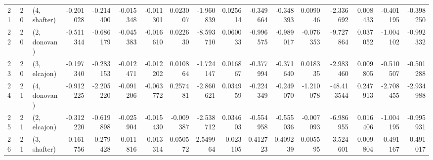\begin{tabular}{lllrrrrrrrrrrrrrr}
21 &    20 &  (4, shafter) & -0.201028 & -0.214400 &  -0.015348 & -0.011301 &  0.023007 &   -1.960839 &  0.025614 &  -0.349664 & -0.348393 &  0.009046 &  -2.336692 &  0.008433 & -0.401195 & -0.398250 \\
22 &    20 &  (2, donovan) & -0.511344 & -0.686179 &  -0.045383 & -0.016610 &  0.022630 &   -8.593710 &  0.060033 &  -0.996575 & -0.989017 & -0.076353 &  -9.727864 &  0.037052 & -1.004102 & -0.992332 \\
23 &    20 &  (3, elcajon) & -0.197340 & -0.283153 &  -0.012471 & -0.012202 &  0.010864 &   -1.724147 &  0.016867 &  -0.377994 & -0.371640 &  0.018335 &  -2.983460 &  0.009805 & -0.510507 & -0.501288 \\
24 &    21 &  (4, donovan) & -0.912225 & -2.205220 &  -0.091206 & -0.063772 &  0.257481 &   -2.860621 &  0.034959 &  -0.224349 & -0.249070 & -1.210078 & -48.413544 &  0.247913 & -2.708455 & -2.934988 \\
25 &    21 &  (2, elcajon) & -0.312220 & -0.619898 &  -0.025904 & -0.015430 & -0.009387 &   -2.538712 &  0.034603 &  -0.554958 & -0.555036 & -0.007093 &  -6.986955 &  0.016406 & -1.004195 & -0.995931 \\
26 &    21 &  (3, shafter) & -0.161756 & -0.279428 &  -0.011816 & -0.013314 &  0.050572 &    2.549964 & -0.023105 &   0.412723 &  0.409239 &  0.005595 &  -3.524601 &  0.009804 & -0.491167 & -0.491017 \\
\bottomrule
\end{tabular}
